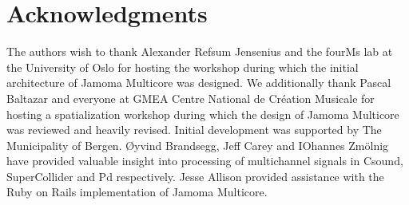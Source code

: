 \documentclass[twoside,a4paper]{article}
\begin{document}








%
\section{Acknowledgments} %
%

The authors wish to thank Alexander Refsum Jensenius and the fourMs lab at the University of Oslo for hosting the workshop during which the initial architecture of Jamoma Multicore was designed. 
We additionally thank Pascal Baltazar and everyone at GMEA Centre National de Cr\' eation Musicale for hosting a spatialization workshop during which the design of Jamoma Multicore was reviewed and heavily revised.
Initial development was supported by The Municipality of Bergen.  
\O yvind Brandsegg, Jeff Carey and IOhannes Zm\"olnig have provided valuable insight into processing of multichannel signals in Csound, SuperCollider and Pd respectively.
Jesse Allison provided assistance with the Ruby on Rails implementation of Jamoma Multicore.





\end{document}

